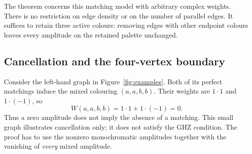 \documentclass[11pt]{article}
\theoremstyle{definition}
\theoremstyle{plain}
\numberwithin{equation}{section}
\begin{document}
The theorem concerns this matching model with arbitrary complex weights.
There is no restriction on edge density or on the number of parallel edges.
It suffices to retain three active colours: removing edges with other
endpoint colours leaves every amplitude on the retained palette unchanged.

\subsection{Cancellation and the four-vertex boundary}

Consider the left-hand graph in Figure~\ref{fig:examples}. Both of its
perfect matchings induce the mixed colouring \((a,a,b,b)\). Their weights
are \(1\cdot1\) and \(1\cdot(-1)\), so
\[
 W(a,a,b,b)=1\cdot1+1\cdot(-1)=0.
\]
Thus a zero amplitude does not imply the absence of a matching. This small
graph illustrates cancellation only; it does not satisfy the GHZ condition.
The proof has to use the nonzero monochromatic amplitudes together with
the vanishing of \emph{every} mixed amplitude.
\end{document}
